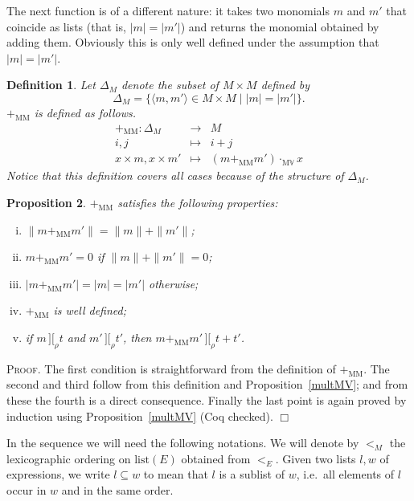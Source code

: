 \documentclass{article}
\newtheorem{definition}{Definition}[section]
\newtheorem{proposition}[definition]{Proposition}
\newenvironment{proof}{\smallskip\textsc{Proof.}}{\hspace*{\fill}$\Box$}
\newcommand{\intII}{\,]\![}
\newcommand{\intrel}{\mathbin{\intII_{\rho}}}
\newcommand{\alt}{\mathrel{|}}
\newcommand{\V}{{\mathbb V}}
\newcommand{\multMV}{\ensuremath{\cdot_{\mathrm M\V}}}
\newcommand{\plusMM}{\ensuremath{+_{\mathrm{MM}}}}
\begin{document}
\bigskip

The next function is of a different nature: it takes two monomials $m$
and $m'$ that coincide as lists (that is, $|m|=|m'|$) and returns the
monomial obtained by adding them.  Obviously this is only well defined
under the assumption that $|m|=|m'|$.

\begin{definition}\label{defn:plusMM} Let $\Delta_M$ denote the subset of
$M\times M$ defined by
\[\Delta_M=\{\langle m,m'\rangle\in M\times M \alt |m|=|m'|\}.\]
{\plusMM} is defined as follows.
\begin{eqnarray*}
\plusMM : \Delta_M & \to & M \\
 i, j & \mapsto & i+j \\
 x\times m, x\times m' & \mapsto & (m\plusMM m')\multMV x
\end{eqnarray*}
Notice that this definition covers all cases because of the structure of
$\Delta_M$.
\end{definition}

\begin{proposition}\label{plusMM}
{\plusMM} satisfies the following properties:
\begin{enumerate}[(i)]
\item $\|m\plusMM m'\|=\|m\|+\|m'\|$;
\item $m\plusMM m'=0$ if $\|m\|+\|m'\|=0$;
\item $|m\plusMM m'|=|m|=|m'|$ otherwise;
\item {\plusMM} is well defined;
\item if $m\intrel t$ and $m'\intrel t'$, then $m\plusMM m'\intrel t+t'$.
\end{enumerate}
\end{proposition}
\begin{proof}
The first condition is straightforward from the definition of {\plusMM}.
The second and third follow from this definition and
Proposition~\ref{multMV}; and from these the fourth is a direct consequence.
Finally the last point is again proved by induction using
Proposition~\ref{multMV} (Coq checked).
\end{proof}

\bigskip

In the sequence we will need the following notations.
We will denote by $<_M$ the lexicographic ordering on $\mathrm{list}(E)$
obtained from $<_E$.
Given two lists $l,w$ of expressions, we write $l\subseteq w$ to mean
that $l$ is a sublist of $w$, i.e.\ all elements of $l$ occur in $w$ and
in the same order.
\end{document}
